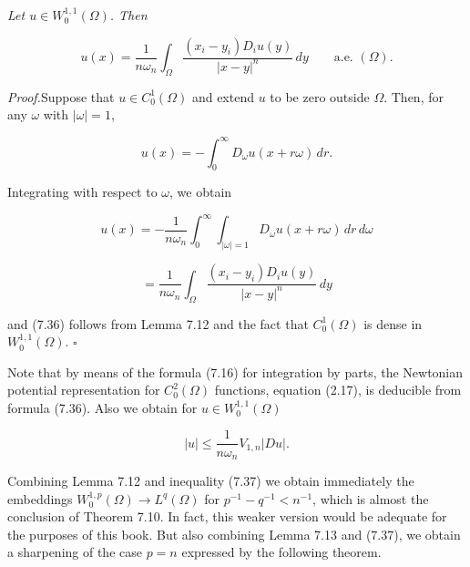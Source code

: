 \begin{lemma}\label{gt:lem-sobolev-newtonian-representation}
\textit{Let $u\in W_0^{1,1}(\Omega)$. Then}

\begin{equation}\tag{7.36}
u(x)=\frac{1}{n\omega_n}\int_{\Omega}\frac{(x_i-y_i)D_i u(y)}{|x-y|^n}\,dy
\qquad \text{a.e. }(\Omega).
\end{equation}

\textit{Proof.}\quad Suppose that $u\in C_0^1(\Omega)$ and extend $u$ to be zero outside $\Omega$. Then, for any
$\omega$ with $|\omega|=1$,

\[
u(x)=-\int_0^{\infty}D_{\omega}u(x+r\omega)\,dr.
\]

Integrating with respect to $\omega$, we obtain

\[
u(x)=-\frac{1}{n\omega_n}\int_0^{\infty}\int_{|\omega|=1}D_{\omega}u(x+r\omega)\,dr\,d\omega
\]

\[
=\frac{1}{n\omega_n}\int_{\Omega}\frac{(x_i-y_i)D_i u(y)}{|x-y|^n}\,dy
\]

and (7.36) follows from Lemma 7.12 and the fact that $C_0^1(\Omega)$ is dense in
$W_0^{1,1}(\Omega)$. $\square$

Note that by means of the formula (7.16) for integration by parts, the Newtonian
potential representation for $C_0^2(\Omega)$ functions, equation (2.17), is deducible
from formula (7.36). Also we obtain for $u\in W_0^{1,1}(\Omega)$

\begin{equation}\tag{7.37}
|u|\le \frac{1}{n\omega_n}V_{1,n}|Du|.
\end{equation}


Combining Lemma 7.12 and inequality (7.37) we obtain immediately the embeddings
$W^{1,p}_0(\Omega)\to L^q(\Omega)$ for $p^{-1}-q^{-1}<n^{-1}$, which is almost the conclusion of Theorem 7.10. In fact, this weaker version would be adequate for the purposes of this book. But also combining Lemma 7.13 and (7.37), we obtain a sharpening of the case $p=n$ expressed by the following theorem.

\end{lemma}


